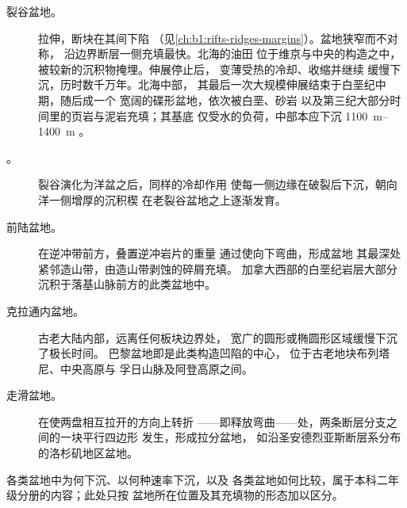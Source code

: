 \begin{description}
  \item[裂谷盆地。] 拉伸，断块在其间下陷
        （见\cref{ch:b1:rifts-ridges-margins}）。盆地狭窄而不对称，
        沿边界断层一侧充填最快。北海的油田
        位于维京与中央的构造之中，
        被较新的沉积物掩埋。伸展停止后，
        变薄受热的冷却、收缩并继续
        缓慢下沉，历时数千万年。北海中部，
        其最后一次大规模伸展结束于白垩纪中期，随后成一个
        宽阔的碟形盆地，依次被白垩、砂岩
        以及第三纪大部分时间里的页岩与泥岩充填；其基底
        仅受水的负荷，中部本应下沉 \qtyrange{1100}{1400}{m}
        。
  \item[。] 裂谷演化为洋盆之后，同样的冷却作用
        使每一侧边缘在破裂后下沉，朝向洋一侧增厚的沉积楔
        在老裂谷盆地之上逐渐发育。
  \item[前陆盆地。] 在逆冲带前方，叠置逆冲岩片的重量
        通过使向下弯曲，形成盆地
        其最深处紧邻造山带，由造山带剥蚀的碎屑充填。
        加拿大西部的白垩纪岩层大部分
        沉积于落基山脉前方的此类盆地中。
  \item[克拉通内盆地。] 古老大陆内部，远离任何板块边界处，
        宽广的圆形或椭圆形区域缓慢下沉了极长时间。
        巴黎盆地即是此类构造凹陷的中心，
        位于古老地块布列塔尼、中央高原与
        孚日山脉及阿登高原之间。
  \item[走滑盆地。] 在使两盘相互拉开的方向上转折
        ——即释放弯曲——处，两条断层分支之间的一块平行四边形
        发生，形成拉分盆地，
        如沿圣安德烈亚斯断层系分布的洛杉矶地区盆地。
\end{description}

各类盆地中为何下沉、以何种速率下沉，以及
各类盆地如何比较，属于本科二年级分册的内容；此处只按
盆地所在位置及其充填物的形态加以区分。

